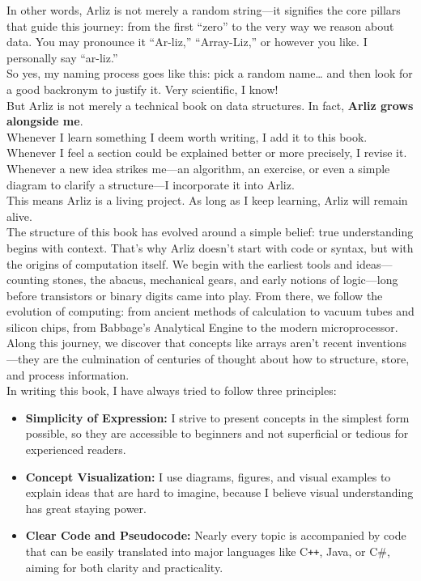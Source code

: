 In other words, Arliz is not merely a random string—it signifies the core pillars that guide this journey: from the first “zero” to the very way we reason about data. You may pronounce it “Ar-liz,” “Array-Liz,” or however you like. I personally say “ar-liz.”\\
So yes, my naming process goes like this: pick a random name… and then look for a good backronym to justify it. Very scientific, I know! \\
But Arliz is not merely a technical book on data structures. In fact, \textbf{Arliz grows alongside me}. \\
Whenever I learn something I deem worth writing, I add it to this book. Whenever I feel a section could be explained better or more precisely, I revise it. Whenever a new idea strikes me—an algorithm, an exercise, or even a simple diagram to clarify a structure—I incorporate it into Arliz.\\
This means Arliz is a living project. As long as I keep learning, Arliz will remain alive.\\	
The structure of this book has evolved around a simple belief: true understanding begins with context. That’s why Arliz doesn’t start with code or syntax, but with the origins of computation itself. We begin with the earliest tools and ideas—counting stones, the abacus, mechanical gears, and early notions of logic—long before transistors or binary digits came into play. From there, we follow the evolution of computing: from ancient methods of calculation to vacuum tubes and silicon chips, from Babbage’s Analytical Engine to the modern microprocessor. Along this journey, we discover that concepts like arrays aren’t recent inventions—they are the culmination of centuries of thought about how to structure, store, and process information.\\
In writing this book, I have always tried to follow three principles:

\begin{itemize}
	\item \textbf{Simplicity of Expression:} I strive to present concepts in the simplest form possible, so they are accessible to beginners and not superficial or tedious for experienced readers.
	\item \textbf{Concept Visualization:} I use diagrams, figures, and visual examples to explain ideas that are hard to imagine, because I believe visual understanding has great staying power.
	\item \textbf{Clear Code and Pseudocode:} Nearly every topic is accompanied by code that can be easily translated into major languages like C\texttt{++}, Java, or C\#, aiming for both clarity and practicality.
\end{itemize}

